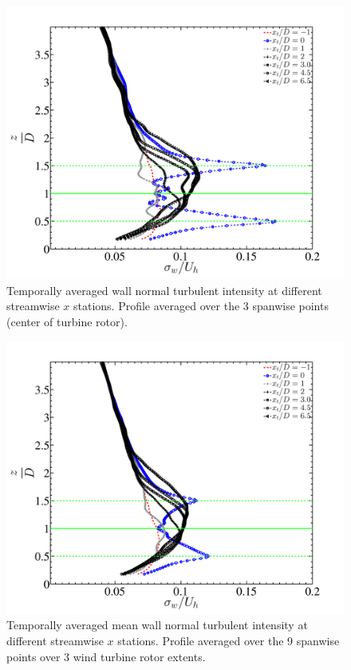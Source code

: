 \begin{figure}
\centering
\includegraphics[width = 0.8\linewidth]{stats/wfluc_3points_avg.pdf}
\caption[Mean $\sigma_{w}$ at $x$ stations 1]{Temporally averaged wall normal turbulent intensity at different streamwise $x$ stations. Profile averaged over the  3 spanwise points (center of turbine rotor).}\label{fig:wstat1}
\end{figure}
\begin{figure}
\centering
\includegraphics[width = 0.8\linewidth]{stats/wfluc_9points_avg.pdf}
\caption[Mean $\sigma_{w}$ at $x$ stations 2]{Temporally averaged mean wall normal turbulent intensity at different streamwise $x$ stations. Profile averaged over the  9 spanwise points over 3 wind turbine rotor extents.}\label{fig:wstat2}
\end{figure}
